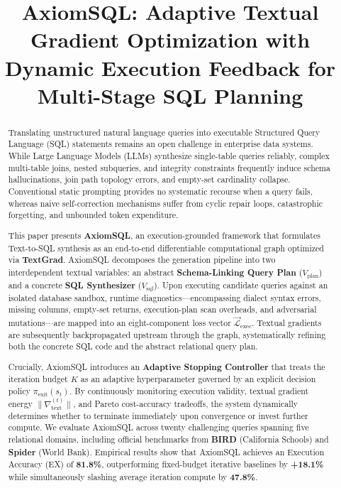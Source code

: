 \documentclass[conference]{IEEEtran}
\begin{document}
\title{AxiomSQL: Adaptive Textual Gradient Optimization with Dynamic Execution Feedback for Multi-Stage SQL Planning}

\author{
}

\maketitle

\begin{abstract}
Translating unstructured natural language queries into executable Structured Query Language (SQL) statements remains an open challenge in enterprise data systems. While Large Language Models (LLMs) synthesize single-table queries reliably, complex multi-table joins, nested subqueries, and integrity constraints frequently induce schema hallucinations, join path topology errors, and empty-set cardinality collapse. Conventional static prompting provides no systematic recourse when a query fails, whereas naive self-correction mechanisms suffer from cyclic repair loops, catastrophic forgetting, and unbounded token expenditure.

This paper presents \textbf{AxiomSQL}, an execution-grounded framework that formulates Text-to-SQL synthesis as an end-to-end differentiable computational graph optimized via \textbf{TextGrad}. AxiomSQL decomposes the generation pipeline into two interdependent textual variables: an abstract \textbf{Schema-Linking Query Plan} ($V_{\text{plan}}$) and a concrete \textbf{SQL Synthesizer} ($V_{\text{sql}}$). Upon executing candidate queries against an isolated database sandbox, runtime diagnostics---encompassing dialect syntax errors, missing columns, empty-set returns, execution-plan scan overheads, and adversarial mutations---are mapped into an eight-component loss vector $\vec{\mathcal{L}}_{\text{exec}}$. Textual gradients are subsequently backpropagated upstream through the graph, systematically refining both the concrete SQL code and the abstract relational query plan.

Crucially, AxiomSQL introduces an \textbf{Adaptive Stopping Controller} that treats the iteration budget $K$ as an adaptive hyperparameter governed by an explicit decision policy $\pi_{\text{exit}}(s_t)$. By continuously monitoring execution validity, textual gradient energy $\|\nabla_{\text{text}}^{(t)}\|$, and Pareto cost-accuracy tradeoffs, the system dynamically determines whether to terminate immediately upon convergence or invest further compute. We evaluate AxiomSQL across twenty challenging queries spanning five relational domains, including official benchmarks from \textbf{BIRD} (California Schools) and \textbf{Spider} (World Bank). Empirical results show that AxiomSQL achieves an Execution Accuracy (EX) of \textbf{81.8\%}, outperforming fixed-budget iterative baselines by \textbf{+18.1\%} while simultaneously slashing average iteration compute by \textbf{47.8\%}.
\end{abstract}
\end{document}

